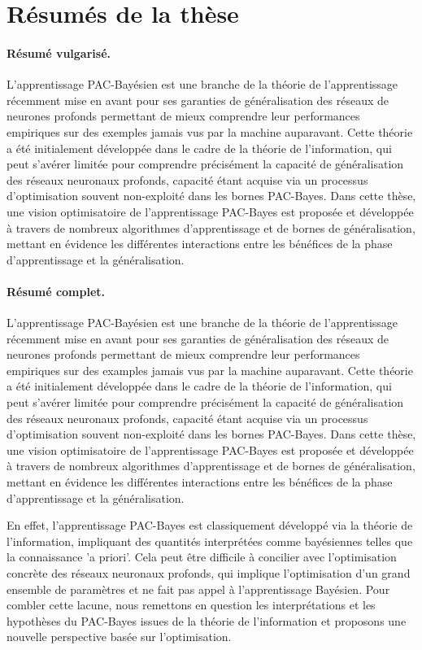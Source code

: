 \section*{Résumés de la thèse}

\paragraph*{Résumé vulgarisé.}
L'apprentissage PAC-Bayésien est une branche de la théorie de l'apprentissage récemment mise en avant pour ses garanties de généralisation des réseaux de neurones profonds permettant de mieux comprendre leur performances empiriques sur des exemples jamais vus par la machine auparavant. Cette théorie a été initialement développée dans le cadre de la théorie de l'information, qui peut s'avérer limitée pour comprendre précisément la capacité de généralisation des réseaux neuronaux profonds, capacité étant acquise via un processus d'optimisation souvent non-exploité dans les bornes PAC-Bayes.  Dans cette thèse, une vision optimisatoire de l'apprentissage PAC-Bayes est proposée et développée à travers de nombreux algorithmes d'apprentissage et de bornes de généralisation, mettant en évidence les différentes interactions entre les bénéfices de la phase d'apprentissage et la généralisation.

\paragraph*{Résumé complet.} 


L'apprentissage PAC-Bayésien est une branche de la théorie de l'apprentissage récemment mise en avant pour ses garanties de généralisation des réseaux de neurones profonds permettant de mieux comprendre leur performances empiriques sur des examples jamais vus par la machine auparavant. Cette théorie a été initialement développée dans le cadre de la théorie de l'information, qui peut s'avérer limitée pour comprendre précisément la capacité de généralisation des réseaux neuronaux profonds, capacité étant acquise via un processus d'optimisation souvent non-exploité dans les bornes PAC-Bayes.  Dans cette thèse, une vision optimisatoire de l'apprentissage PAC-Bayes est proposée et développée à travers de nombreux algorithmes d'apprentissage et de bornes de généralisation, mettant en évidence les différentes interactions entre les bénéfices de la phase d'apprentissage et la généralisation.

En effet, l'apprentissage PAC-Bayes est classiquement développé via la théorie de l'information, impliquant des quantités interprétées comme bayésiennes telles que la connaissance 'a priori'. Cela peut être difficile à concilier avec l'optimisation concrète des réseaux neuronaux profonds, qui implique l'optimisation d'un grand ensemble de paramètres et ne fait pas appel à l'apprentissage Bayésien. Pour combler cette lacune, nous remettons en question les interprétations et les hypothèses du PAC-Bayes issues de la théorie de l'information et proposons une nouvelle perspective basée sur l'optimisation. 


